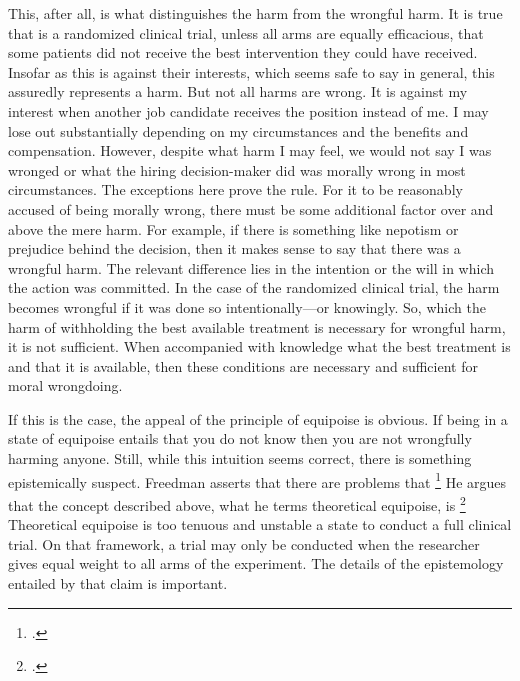 \documentclass[letterpaper,notitlepage,12pt]{article}
\begin{document}
This, after all, is what distinguishes the harm from the wrongful harm.
It is true that is a randomized clinical trial, unless all arms are equally
efficacious, that some patients did not receive the best intervention they could
have received.
Insofar as this is against their interests, which seems safe to say in general,
this assuredly represents a harm.
But not all harms are wrong.
It is against my interest when another job candidate receives the position
instead of me.
I may lose out substantially depending on my circumstances and the benefits and
compensation.
However, despite what harm I may feel, we would not say I was wronged or what
the hiring decision-maker did was morally wrong in most circumstances.
The exceptions here prove the rule.
For it to be reasonably accused of being morally wrong, there must be some
additional factor over and above the mere harm.
For example, if there is something like nepotism or prejudice behind the
decision, then it makes sense to say that there was a wrongful harm.
The relevant difference lies in the intention or the will in which the action
was committed.
In the case of the randomized clinical trial, the harm becomes wrongful if it
was done so intentionally---or knowingly.
So, which the harm of withholding the best available treatment is necessary for
wrongful harm, it is not sufficient.
When accompanied with knowledge what the best treatment is and that it is
available, then these conditions are necessary and sufficient for moral
wrongdoing.

If this is the case, the appeal of the principle of equipoise is obvious.
If being in a state of equipoise entails that you do not know then you are not
wrongfully harming anyone.
Still, while this intuition seems correct, there is something epistemically
suspect.
Freedman asserts that there are problems that \footcite[p. 141]{freedman_equipoise_1987}
He argues that the concept described above, what he terms theoretical equipoise,
is \footcite[p.
429]{freedman_equipoise_1987}
Theoretical equipoise is too tenuous and unstable a state to conduct a full
clinical trial.
On that framework, a trial may only be conducted when the researcher gives equal
weight to all arms of the experiment.
The details of the epistemology entailed by that claim is important.
\end{document}
